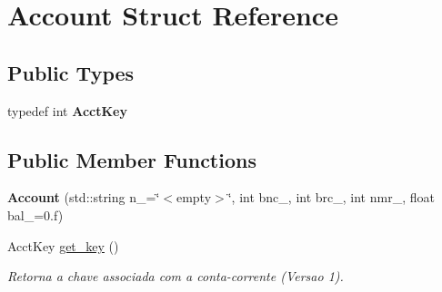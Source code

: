 \hypertarget{structAccount}{}\section{Account Struct Reference}
\label{structAccount}
\subsection*{Public Types}
\begin{DoxyCompactItemize}
\item 
typedef int {\bfseries Acct\+Key}\hypertarget{structAccount_a52aba1d1def6d3d00780834c21604398}{}\label{structAccount_a52aba1d1def6d3d00780834c21604398}

\end{DoxyCompactItemize}
\subsection*{Public Member Functions}
\begin{DoxyCompactItemize}
\item 
{\bfseries Account} (std\+::string n\+\_\+=\char`\"{}$<$empty$>$\char`\"{}, int bnc\+\_, int brc\+\_, int nmr\+\_, float bal\+\_\+=0.f)\hypertarget{structAccount_a9b8c495ed2aa96ae3f3e32eda9e88f22}{}\label{structAccount_a9b8c495ed2aa96ae3f3e32eda9e88f22}

\item 
Acct\+Key \hyperlink{structAccount_a2a2b6139badc3584869757b6afcc2913}{get\+\_\+key} ()\hypertarget{structAccount_a2a2b6139badc3584869757b6afcc2913}{}\label{structAccount_a2a2b6139badc3584869757b6afcc2913}

\begin{DoxyCompactList}\small\item\em Retorna a chave associada com a conta-\/corrente (Versao 1). \end{DoxyCompactList}\end{DoxyCompactItemize}
